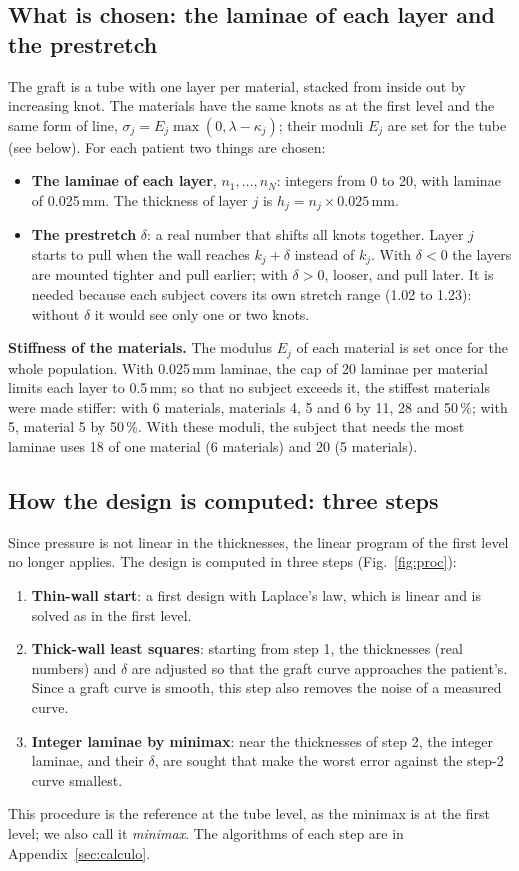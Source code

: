 \subsection{What is chosen: the laminae of each layer and the prestretch}
The graft is a tube with one layer per material, stacked from inside out by increasing knot. The materials have the same knots as at the first level and the same form of line, $\sigma_j=E_j\max(0,\lambda-\kappa_j)$; their moduli $E_j$ are set for the tube (see below). For each patient two things are chosen:
\begin{itemize}
\item \textbf{The laminae of each layer}, $n_1,\dots,n_N$: integers from 0 to 20, with laminae of 0.025\,mm. The thickness of layer $j$ is $h_j=n_j\times0.025$\,mm.
\item \textbf{The prestretch} $\delta$: a real number that shifts all knots together. Layer $j$ starts to pull when the wall reaches $k_j+\delta$ instead of $k_j$. With $\delta<0$ the layers are mounted tighter and pull earlier; with $\delta>0$, looser, and pull later. It is needed because each subject covers its own stretch range (1.02 to 1.23): without $\delta$ it would see only one or two knots.
\end{itemize}
\textbf{Stiffness of the materials.} The modulus $E_j$ of each material is set once for the whole population. With 0.025\,mm laminae, the cap of 20 laminae per material limits each layer to 0.5\,mm; so that no subject exceeds it, the stiffest materials were made stiffer: with 6 materials, materials 4, 5 and 6 by 11, 28 and 50\,\%; with 5, material 5 by 50\,\%. With these moduli, the subject that needs the most laminae uses 18 of one material (6 materials) and 20 (5 materials).

\subsection{How the design is computed: three steps}
Since pressure is not linear in the thicknesses, the linear program of the first level no longer applies. The design is computed in three steps (Fig.~\ref{fig:proc}):
\begin{enumerate}
\item \textbf{Thin-wall start}: a first design with Laplace's law, which is linear and is solved as in the first level.
\item \textbf{Thick-wall least squares}: starting from step 1, the thicknesses (real numbers) and $\delta$ are adjusted so that the graft curve approaches the patient's. Since a graft curve is smooth, this step also removes the noise of a measured curve.
\item \textbf{Integer laminae by minimax}: near the thicknesses of step 2, the integer laminae, and their $\delta$, are sought that make the worst error against the step-2 curve smallest.
\end{enumerate}
This procedure is the reference at the tube level, as the minimax is at the first level; we also call it \emph{minimax}. The algorithms of each step are in Appendix~\ref{sec:calculo}.

